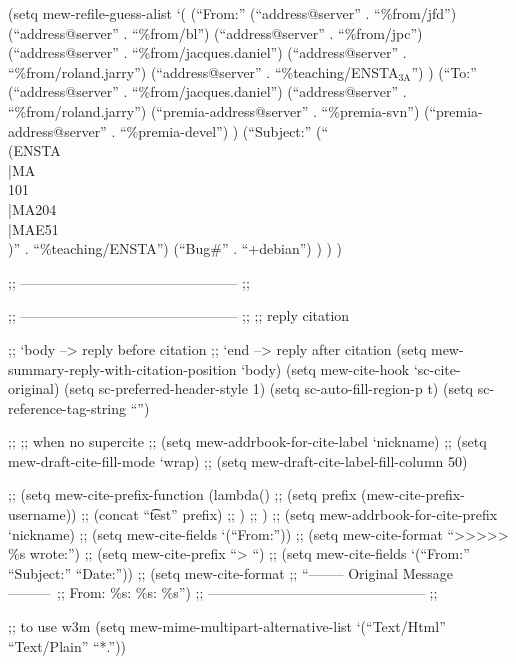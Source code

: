 \documentclass[11pt]{article}
\begin{document}
(setq mew-refile-guess-alist
      `(
        (``From:''
         (``address@server'' . ``\%from/jfd'')
         (``address@server'' . ``\%from/bl'')
         (``address@server'' . ``\%from/jpc'')
         (``address@server'' . ``\%from/jacques.daniel'')
         (``address@server'' . ``\%from/roland.jarry'')
         (``address@server'' . ``\%teaching/ENSTA$_{\mathrm{3A}}$'')
         )
        (``To:''
         (``address@server'' . ``\%from/jacques.daniel'')
         (``address@server'' . ``\%from/roland.jarry'')
         (``premia-address@server'' . ``\%premia-svn'')
         (``premia-address@server'' . ``\%premia-devel'')
         )
        (``Subject:''
         (``\\(ENSTA\\|MA\\ 101\\|MA204\\|MAE51\\)'' . ``\%teaching/ENSTA'')
         (``Bug\#'' . ``+debian'')
         )
        )
      )

;; ----------------------------------------------- ;;


;; ----------------------------------------------- ;;
;; reply citation

;; `body --> reply before citation
;; `end  --> reply after citation
(setq mew-summary-reply-with-citation-position `body)
(setq mew-cite-hook `sc-cite-original)
(setq sc-preferred-header-style 1)
(setq sc-auto-fill-region-p t)
(setq sc-reference-tag-string ``'')

;; ;; when no supercite
;; (setq mew-addrbook-for-cite-label `nickname)
;; (setq mew-draft-cite-fill-mode `wrap)
;; (setq mew-draft-cite-label-fill-column 50)

;; (setq mew-cite-prefix-function (lambda()
;;                               (setq prefix (mew-cite-prefix-username))
;;                               (concat ``\t test'' prefix)
;;                               )
;;    )
;; (setq mew-addrbook-for-cite-prefix `nickname)
;; (setq mew-cite-fields `(``From:''))
;; (setq mew-cite-format ``\n\n>>>>> \%s wrote:\n\n'')
;; (setq mew-cite-prefix ``> ``)
;; (setq mew-cite-fields `(``From:'' ``Subject:'' ``Date:''))
;; (setq mew-cite-format 
;; ``\n\n-------- Original Message ---------\n\
;; From: \%s\nSubject: \%s\nDate: \%s\n\n'')
;; ----------------------------------------------- ;;




;; to use w3m
(setq mew-mime-multipart-alternative-list `(``Text/Html'' ``Text/Plain'' ``*.''))
\end{document}
